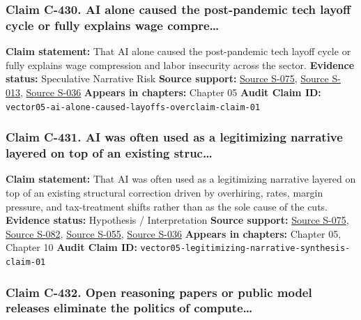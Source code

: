 \documentclass[
  american,
  11pt,
  letterpaper,
]{article}
\begin{document}
\subsubsection{Claim C-430. AI alone caused the post-pandemic tech
layoff cycle or fully explains wage
compre\ldots{}}\label{claim-c-430-ai-alone-caused-the-post-pandemic-tech-layoff-cycle-or-fully-explains-wage-compre}

\textbf{Claim statement:} That AI alone caused the post-pandemic tech
layoff cycle or fully explains wage compression and labor insecurity
across the sector. \textbf{Evidence status:} Speculative Narrative Risk
\textbf{Source support:}
\hyperref[source-s-075-notice-2023-63-guidance-on-section-174-and-specified-research-or-experimental-expenditures]{Source
S-075},
\hyperref[source-s-013-meta-posts-lower-q4-profit-announces-huge-stock-buyback]{Source
S-013}, \hyperref[source-s-036-annual-economic-report-2026]{Source
S-036} \textbf{Appears in chapters:} Chapter 05 \textbf{Audit Claim ID:}
\texttt{vector05-ai-alone-caused-layoffs-overclaim-claim-01}

\subsubsection{Claim C-431. AI was often used as a legitimizing
narrative layered on top of an existing
struc\ldots{}}\label{claim-c-431-ai-was-often-used-as-a-legitimizing-narrative-layered-on-top-of-an-existing-struc}

\textbf{Claim statement:} That AI was often used as a legitimizing
narrative layered on top of an existing structural correction driven by
overhiring, rates, margin pressure, and tax-treatment shifts rather than
as the sole cause of the cuts. \textbf{Evidence status:} Hypothesis /
Interpretation \textbf{Source support:}
\hyperref[source-s-075-notice-2023-63-guidance-on-section-174-and-specified-research-or-experimental-expenditures]{Source
S-075},
\hyperref[source-s-082-mark-zuckerberg-s-message-to-meta-employees]{Source
S-082},
\hyperref[source-s-055-ai-exuberance-masks-broad-weakness-in-tech-sector-say-investors]{Source
S-055}, \hyperref[source-s-036-annual-economic-report-2026]{Source
S-036} \textbf{Appears in chapters:} Chapter 05, Chapter 10
\textbf{Audit Claim ID:}
\texttt{vector05-legitimizing-narrative-synthesis-claim-01}

\subsubsection{Claim C-432. Open reasoning papers or public model
releases eliminate the politics of
compute\ldots{}}\label{claim-c-432-open-reasoning-papers-or-public-model-releases-eliminate-the-politics-of-compute}
\end{document}
